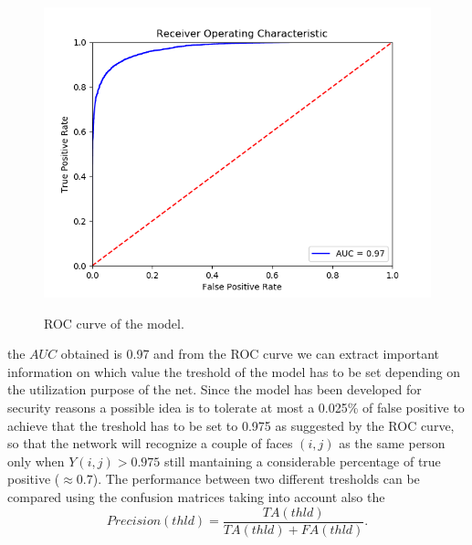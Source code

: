 \begin{figure}[t]
\begin{center}
\includegraphics[width=0.8\linewidth]{images/FINAL_ROC.png}
   \caption{ROC curve of the model.}
\label{fig:long}
\label{fig:onecol}
\end{center}
\end{figure}

the $AUC$ obtained is 0.97 and from the ROC curve we can extract important information on which value the treshold of the model has to be set depending on the utilization purpose of the net.
Since the model has been developed for security reasons a possible idea is to tolerate at most a 0.025\% of false positive to achieve that the treshold has to be set to 0.975 as suggested by the ROC curve, so that the network will recognize a couple of faces $(i,j)$ as the same person only when $Y(i,j)>0.975$ still mantaining a considerable percentage of true positive ($\approx 0.7$). The performance between two different tresholds can be compared using the confusion matrices taking into account also the
\begin{equation}
Precision(thld) = \frac{TA(thld)}{TA(thld)+FA(thld)}. 
\end{equation}
 
 

